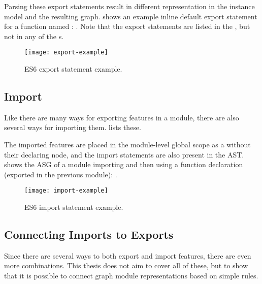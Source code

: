 Parsing these export statements result in different representation in the instance model and the resulting graph.  shows an example inline default export statement for a function named : . Note that the export statements are listed in the , but not in any of the s.

\begin{figure}[htbp]
  \centering
  \texttt{[image: export-example]}
  \caption{ES6 export statement example.}
  \label{fig:es6-export-example}
\end{figure}


\subsection{Import}
Like there are many ways for exporting features in a module, there are also several ways for importing them.  lists these.

\begin{figure}[htbp]
	\begin{minipage}{\textwidth}
		
	\end{minipage}
\end{figure}

The imported features are placed in the module-level global scope as a  without their declaring node, and the import statements are also present in the AST.  shows the ASG of a module importing and then using a function declaration (exported in the previous module): .

\begin{figure}[htbp]
  \centering
  \texttt{[image: import-example]}
  \caption{ES6 import statement example.}
  \label{fig:es6-import-example}
\end{figure}

\subsection{Connecting Imports to Exports}
Since there are several ways to both export and import features, there are even more combinations. This thesis does not aim to cover all of these, but to show that it is possible to connect graph module representations based on simple rules.

